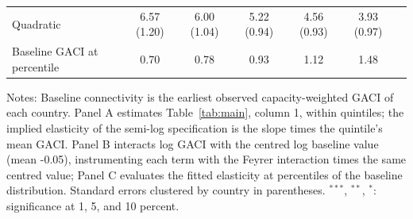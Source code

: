 \documentclass[12pt]{extarticle}
\begin{document}
\begin{table}[H]
{\begin{threeparttable}
\begin{tabular}{lcccccc}
  Quadratic & 6.57 (1.20) & 6.00 (1.04) & 5.22 (0.94) & 4.56 (0.93) & 3.93 (0.97) & \\
  Baseline GACI at percentile & 0.70 & 0.78 & 0.93 & 1.12 & 1.48 & \\
\bottomrule
\end{tabular}
\begin{tablenotes}[flushleft]
\footnotesize
\item Notes: Baseline connectivity is the earliest observed capacity-weighted GACI of each country. Panel A estimates Table~\ref{tab:main}, column 1, within quintiles; the implied elasticity of the semi-log specification is the slope times the quintile's mean GACI. Panel B interacts log GACI with the centred log baseline value (mean -0.05), instrumenting each term with the Feyrer interaction times the same centred value; Panel C evaluates the fitted elasticity at percentiles of the baseline distribution. Standard errors clustered by country in parentheses. $^{***}$, $^{**}$, $^{*}$: significance at 1, 5, and 10 percent.
\end{tablenotes}
\end{threeparttable}}
\end{table}
\end{document}

